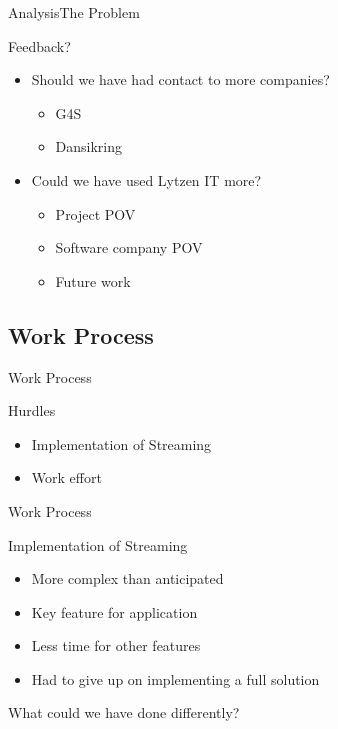\begin{frame}{Analysis}{The Problem}
    \begin{block}{Feedback?}
    \begin{itemize}
        \item Should we have had contact to more companies?
        \begin{itemize}
            \item G4S
            \item Dansikring
        \end{itemize}
        \item Could we have used Lytzen IT more?
        \begin{itemize}
            \item Project POV
            \item Software company POV
            \item Future work
        \end{itemize}
    \end{itemize}
    \end{block}
\end{frame}

\subsection{Work Process}
\begin{frame}{Work Process}
    \begin{block}{Hurdles}
    \begin{itemize}
        \item Implementation of Streaming
        \item Work effort
    \end{itemize}
    \end{block}
\end{frame}

\begin{frame}{Work Process}
    \begin{block}{Implementation of Streaming}
        \begin{itemize}
            \item More complex than anticipated
            \item Key feature for application
            \item Less time for other features
            \item Had to give up on implementing a full solution
        \end{itemize}
        What could we have done differently?
    \end{block}
\end{frame}

